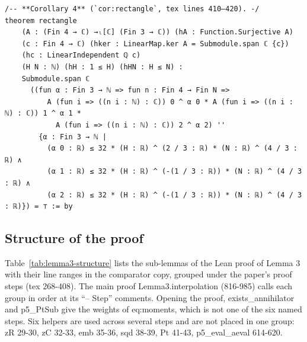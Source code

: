 \begin{listing}[tbp]
\caption{Corollary 4, lean-checks/\allowbreak comparator-copy/\allowbreak PaperLemma3/\allowbreak Bridge.lean:96-109 (sha256 af401514\ldots).}\label{lst:rectangle} %
\begin{Verbatim}
/-- **Corollary 4** (`cor:rectangle`, tex lines 410–420). -/
theorem rectangle
    (A : (Fin 4 → ℂ) →ₗ[ℂ] (Fin 3 → ℂ)) (hA : Function.Surjective A)
    (c : Fin 4 → ℂ) (hker : LinearMap.ker A = Submodule.span ℂ {c})
    (hc : LinearIndependent ℚ c)
    (H N : ℕ) (hH : 1 ≤ H) (hHN : H ≤ N) :
    Submodule.span ℂ
      ((fun α : Fin 3 → ℕ => fun n : Fin 4 → Fin N =>
          A (fun i => ((n i : ℕ) : ℂ)) 0 ^ α 0 * A (fun i => ((n i : ℕ) : ℂ)) 1 ^ α 1 *
            A (fun i => ((n i : ℕ) : ℂ)) 2 ^ α 2) ''
        {α : Fin 3 → ℕ |
          (α 0 : ℝ) ≤ 32 * (H : ℝ) ^ (2 / 3 : ℝ) * (N : ℝ) ^ (4 / 3 : ℝ) ∧
          (α 1 : ℝ) ≤ 32 * (H : ℝ) ^ (-(1 / 3 : ℝ)) * (N : ℝ) ^ (4 / 3 : ℝ) ∧
          (α 2 : ℝ) ≤ 32 * (H : ℝ) ^ (-(1 / 3 : ℝ)) * (N : ℝ) ^ (4 / 3 : ℝ)}) = ⊤ := by
\end{Verbatim}
\end{listing}

\subsection{Structure of the proof}

Table~\ref{tab:lemma3-structure} lists the sub-lemmas of the Lean proof of Lemma 3 with their line ranges in the comparator copy, grouped under the paper's proof steps (tex 268-408). %
The main proof Lemma3.interpolation (816-985) calls each group in order at its ``-- Step'' comments. %
Opening the proof, exists\_annihilator and p5\_PtSub give the weights of eq:moments, which is not one of the six named steps. %
Six helpers are used across several steps and are not placed in one group: zR 29-30, zC 32-33, emb 35-36, sqd 38-39, Pt 41-43, p5\_eval\_aeval 614-620. %

